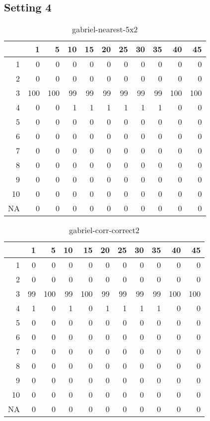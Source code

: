 \documentclass[11pt]{article}
\begin{document}
\subsection{Setting 4}


\begin{table}[H]
\centering
\begin{tabular}{rrrrrrrrrrr}
  \hline
 & 1 & 5 & 10 & 15 & 20 & 25 & 30 & 35 & 40 & 45 \\ 
  \hline
1 & 0 & 0 & 0 & 0 & 0 & 0 & 0 & 0 & 0 & 0 \\ 
  2 & 0 & 0 & 0 & 0 & 0 & 0 & 0 & 0 & 0 & 0 \\ 
  3 & 100 & 100 & 99 & 99 & 99 & 99 & 99 & 99 & 100 & 100 \\ 
  4 & 0 & 0 & 1 & 1 & 1 & 1 & 1 & 1 & 0 & 0 \\ 
  5 & 0 & 0 & 0 & 0 & 0 & 0 & 0 & 0 & 0 & 0 \\ 
  6 & 0 & 0 & 0 & 0 & 0 & 0 & 0 & 0 & 0 & 0 \\ 
  7 & 0 & 0 & 0 & 0 & 0 & 0 & 0 & 0 & 0 & 0 \\ 
  8 & 0 & 0 & 0 & 0 & 0 & 0 & 0 & 0 & 0 & 0 \\ 
  9 & 0 & 0 & 0 & 0 & 0 & 0 & 0 & 0 & 0 & 0 \\ 
  10 & 0 & 0 & 0 & 0 & 0 & 0 & 0 & 0 & 0 & 0 \\ 
  NA & 0 & 0 & 0 & 0 & 0 & 0 & 0 & 0 & 0 & 0 \\ 
   \hline
\end{tabular}
\caption{gabriel-nearest-5x2} 
\end{table}
\begin{table}[H]
\centering
\begin{tabular}{rrrrrrrrrrr}
  \hline
 & 1 & 5 & 10 & 15 & 20 & 25 & 30 & 35 & 40 & 45 \\ 
  \hline
1 & 0 & 0 & 0 & 0 & 0 & 0 & 0 & 0 & 0 & 0 \\ 
  2 & 0 & 0 & 0 & 0 & 0 & 0 & 0 & 0 & 0 & 0 \\ 
  3 & 99 & 100 & 99 & 100 & 99 & 99 & 99 & 99 & 100 & 100 \\ 
  4 & 1 & 0 & 1 & 0 & 1 & 1 & 1 & 1 & 0 & 0 \\ 
  5 & 0 & 0 & 0 & 0 & 0 & 0 & 0 & 0 & 0 & 0 \\ 
  6 & 0 & 0 & 0 & 0 & 0 & 0 & 0 & 0 & 0 & 0 \\ 
  7 & 0 & 0 & 0 & 0 & 0 & 0 & 0 & 0 & 0 & 0 \\ 
  8 & 0 & 0 & 0 & 0 & 0 & 0 & 0 & 0 & 0 & 0 \\ 
  9 & 0 & 0 & 0 & 0 & 0 & 0 & 0 & 0 & 0 & 0 \\ 
  10 & 0 & 0 & 0 & 0 & 0 & 0 & 0 & 0 & 0 & 0 \\ 
  NA & 0 & 0 & 0 & 0 & 0 & 0 & 0 & 0 & 0 & 0 \\ 
   \hline
\end{tabular}
\caption{gabriel-corr-correct2} 
\end{table}
\end{document}

